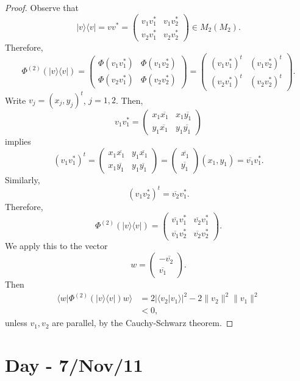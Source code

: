 \documentclass[12pt]{article}
\theoremstyle{definition}
\begin{document}
\begin{proof}
Observe that
\[
|v\rangle\langle v| = vv^* = \begin{pmatrix}v_1v_1^* & v_1v_2^*\\ v_2v_1^* & v_2v_2^*\end{pmatrix} \in M_2(M_2).
\]
Therefore,
\[
\Phi^{(2)}(|v\rangle\langle v|)=\begin{pmatrix}\Phi(v_1v_1^*) & \Phi(v_1v_2^*)\\ \Phi(v_2v_1^*) & \Phi(v_2v_2^*)\end{pmatrix}=\begin{pmatrix}(v_1v_1^*)^t & (v_1v_2^*)^t\\ (v_2v_1^*)^t & (v_2v_2^*)^t\end{pmatrix}.
\]
Write $v_j=(x_j,y_j)^t$, $j=1,2$. Then,
\[
v_1v_1^* = \begin{pmatrix}x_1\overline{x_1} & x_1\overline{y_1}\\ y_1\overline{x_1} & y_1\overline{y_1}\end{pmatrix}
\]
implies
\[
(v_1v_1^*)^t = \begin{pmatrix}x_1\overline{x_1} & y_1\overline{x_1}\\ x_1\overline{y_1} & y_1\overline{y_1}\end{pmatrix} = \begin{pmatrix}\overline{x_1}\\ \overline{y_1}\end{pmatrix}(x_1,y_1)=\overline{v_1}v_1^*.
\]
Similarly,
\[
(v_1v_2^*)^t = \overline{v_2}v_1^*.
\]
Therefore,
\[
\Phi^{(2)}(|v\rangle\langle v|)=\begin{pmatrix}\overline{v_1}v_1^* & \overline{v_2}v_1^*\\ \overline{v_1}v_2^* & \overline{v_2}v_2^*\end{pmatrix}.
\]
We apply this to the vector
\[
w=\begin{pmatrix}-\overline{v_2}\\ \overline{v_1}\end{pmatrix}.
\]
Then
\begin{align*}
\langle w|\Phi^{(2)}(|v\rangle\langle v|)w\rangle &= 2|\langle v_2|v_1\rangle|^2 - 2\|v_2\|^2\|v_1\|^2 \\
&< 0,
\end{align*}
unless $v_1,v_2$ are parallel, by the Cauchy-Schwarz theorem.
\end{proof}

\section{Day - 7/Nov/11}
\end{document}
